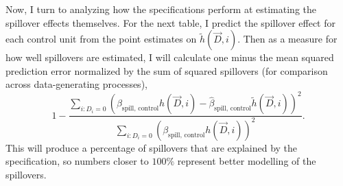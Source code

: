 \documentclass[11pt]{article}
\begin{document}
Now, I turn to analyzing how the specifications perform at estimating the spillover effects themselves. For the next table, I predict the spillover effect for each control unit from the point estimates on $\tilde{h}(\vec{D}, i)$. Then as a measure for how well spillovers are estimated, I will calculate one minus the mean squared prediction error normalized by the sum of squared spillovers (for comparison across data-generating processes), \[ 
    1 - \frac{\sum_{i: D_i = 0} (\beta_{\text{spill, control}} h(\vec{D}, i) - \hat{\beta}_{\text{spill, control}} \tilde{h}(\vec{D}, i))^2}{\sum_{i: D_i = 0} (\beta_{\text{spill, control}} h(\vec{D}, i))^2}.
\] This will produce a percentage of spillovers that are explained by the specification, so numbers closer to $100\%$ represent better modelling of the spillovers. 

\end{document}
